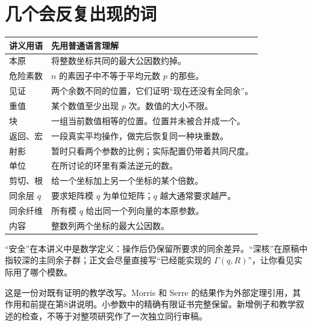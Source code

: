 \section*{几个会反复出现的词}
\begin{longtable}{p{}p{}}
\toprule 讲义用语 & 先用普通语言理解\\\midrule
本原 & 将整数坐标共同的最大公因数约掉。\\
危险素数 & $n$ 的素因子中不等于平均元数 $p$ 的那些。\\
见证 & 两个余数不同的位置，它们证明“现在还没有全同余”。\\
重值 & 某个数值至少出现 $p$ 次。数值的大小不限。\\
块 & 一组当前数值相等的位置。位置并未被合并成一个。\\
返回、宏 & 一段真实平均操作，做完后恢复同一种块重数。\\
射影 & 暂时只看两个参数的比例；实际配置仍带着共同尺度。\\
单位 & 在所讨论的环里有乘法逆元的数。\\
剪切、根 & 给一个坐标加上另一个坐标的某个倍数。\\
同余层 $q$ & 要求矩阵模 $q$ 为单位矩阵；$q$ 越大通常要求越严。\\
同余纤维 & 所有模 $q$ 给出同一个列向量的本原参数。\\
内容 & 整数列两个坐标的最大公因数。\\\bottomrule
\end{longtable}
“安全”在本讲义中是数学定义：操作后仍保留所要求的同余差异。“深核”在原稿中指较深的主同余子群；正文会尽量直接写“已经能实现的 $\Gamma(q,R)$”，让你看见实际用了哪个模数。

这是一份对既有证明的教学改写。Morris 和 Serre 的结果作为外部定理引用，其作用和前提在第8讲说明。小参数中的精确有限证书完整保留。新增例子和教学叙述的检查，不等于对整项研究作了一次独立同行审稿。
